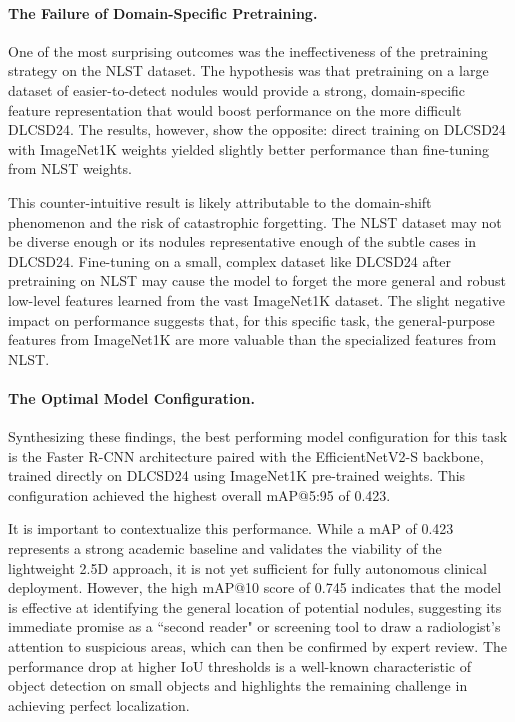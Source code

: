 \paragraph{The Failure of Domain-Specific Pretraining.}
One of the most surprising outcomes was the ineffectiveness of the pretraining strategy on the NLST dataset. The hypothesis was that pretraining on a large dataset of easier-to-detect nodules would provide a strong, domain-specific feature representation that would boost performance on the more difficult DLCSD24. The results, however, show the opposite: direct training on DLCSD24 with ImageNet1K weights yielded slightly better performance than fine-tuning from NLST weights.

This counter-intuitive result is likely attributable to the domain-shift phenomenon and the risk of catastrophic forgetting. The NLST dataset may not be diverse enough or its nodules representative enough of the subtle cases in DLCSD24. Fine-tuning on a small, complex dataset like DLCSD24 after pretraining on NLST may cause the model to forget the more general and robust low-level features learned from the vast ImageNet1K dataset. The slight negative impact on performance suggests that, for this specific task, the general-purpose features from ImageNet1K are more valuable than the specialized features from NLST.

\paragraph{The Optimal Model Configuration.}
Synthesizing these findings, the best performing model configuration for this task is the Faster R-CNN architecture paired with the EfficientNetV2-S backbone, trained directly on DLCSD24 using ImageNet1K pre-trained weights. This configuration achieved the highest overall mAP@5:95 of 0.423.

It is important to contextualize this performance. While a mAP of 0.423 represents a strong academic baseline and validates the viability of the lightweight 2.5D approach, it is not yet sufficient for fully autonomous clinical deployment. However, the high mAP@10 score of 0.745 indicates that the model is effective at identifying the general location of potential nodules, suggesting its immediate promise as a ``second reader" or screening tool to draw a radiologist's attention to suspicious areas, which can then be confirmed by expert review. The performance drop at higher IoU thresholds is a well-known characteristic of object detection on small objects and highlights the remaining challenge in achieving perfect localization.

